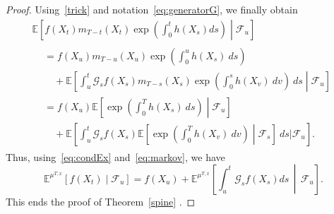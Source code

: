 \documentclass[AHL,Unicode,longabstracts,published]{cedram}
\newcommand{\Fo}{\mathcal{F}}
\newcommand{\Go}{\mathcal{G}}
\newcommand*\E{\mathbb{E}}
\begin{document}
\begin{proof}
Using~\eqref{trick} and notation~\eqref{eq:generatorG}, we finally obtain
\begin{multline*}
\E\left[f\left(X_{t}\right)m_{T-t}\left(X_{t}\right)\exp\left(\int_{0}^{t}h\left(X_{s}\right)ds \right)\middle| \Fo_{u}\right]\\
\begin{aligned}
&=f\left(X_{u}\right)m_{T-u}\left(X_{u}\right)\exp\left(\int_{0}^{u}h\left(X_{s}\right)\ ds \right)\\
&\quad+\E\left[\int_{u}^{t}\Go_{s}f\left(X_{s}\right)m_{T-s}\left(X_{s}\right) \exp\left(\int_{0}^{s}h\left(X_{v}\right)\ dv \right)\ ds\middle| \Fo_{u}\right]\\
&= f\left(X_{u}\right)\E\left[\exp\left(\int_{0}^{T}h\left(X_{s}\right)\ ds \right)\middle| \Fo_{u} \right] \\
&\quad+\E\left[\int_{u}^{t}\Go_{s}f\left(X_{s}\right) \E\left[\exp\left(\int_{0}^{T}h\left(X_{v}\right)\ dv \right)\middle| \Fo_{s}\right]\ ds\Bigg| \Fo_{u}\right].
\end{aligned}
\end{multline*}
Thus, using~\eqref{eq:condEx} and~\eqref{eq:markov}, we have
\[
\E^{\mu^{T, x}}\left[f\left(X_{t}\right)\middle| \Fo_{u}\right] =f\left(X_{u}\right)+\E^{\mu^{T, x}}\left[\int_{u}^{t}\Go_{s}f(X_{s})ds \,\middle|\, \Fo_{u}\right].
\]
This ends the proof of Theorem~\ref{spine} .
\end{proof}




\end{document}
